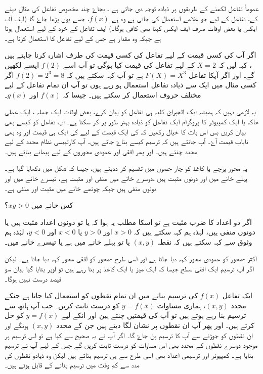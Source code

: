 عموماً تفاعل لکھنے کے طریقوں پر ذیادہ توجہ دی جاتی ہے ، بجاۓ چند مخصوص تفاعل کی مثال دینے کے، تفاعل کے لیے جو علامے استعمال کی جاتی ہے وہ ہے \(f(x) \)، جسے یوں پڑھا جاۓ گا (ایف آف ایکس یا بعض اوقات صرف ایف ایکس کہنا بھی کافی ہوگا۔) ایف  تفاعل کے خود کے لیے استعمال ہوتا ہے جبکہ  وہ مقدار ہے جس کے لیے تفاعل کا استعمال کرنا ہے۔
 
اگر آپ  کی کسی قیمت کے لیے تفاعل کی کسی قیمت کی طرف اشارہ کرنا چاہتے ہیں ، کہہ لیں کہ \( X=2          \) کے لیے تفاعل کی قیمت کیا ہوگی تو آپ اسے \(f(2) \) ایسے لکھیں گے۔ اور اگر آپکا تفاعل \( F(X) =X^{3}         \) ہے تو آپ کہہ سکتے ہیں کہ \(f(2)=2^{3}=8\)
اگر کسی مثال میں ایک سے ذیادہ تفاعل استعمال ہو رہے ہوں تو آپ ان تمام تفاعل کے لیے مختلف حروف استعمال کر سکتے ہیں۔ جیسا کہ \( f(x)         \) اور \(g(x)  \)۔

یہ لازمی نہیں کہ ہمیشہ ایک الجبرائ کلیہ ہی تفاعل کو بیان کرے، بعض اوقات ایک جملہ ،  ایک عملی خاکہ   یا ایک کمپیوٹر کا پروگرام  ایک تفاعل کو ذیادہ بہتر طور پر   کر سکتا ہے۔ آپ تفاعل کو کیسے بھی بیان کریں بس اس بات کا خیال رکھیں کہ  کی ایک قیمت کے لیے  کی ایک ہی قیمت اور وہ بھی نایاب قیمت آۓ۔
آپ جانتے ہیں کہ ترسیم کیسے بناۓ جاتے ہیں۔ آپ کارتییسی نظام محدد کے لیے محدد چنتے ہیں۔ اور پھر افقی اور عمودی محوروں کے لیے پیمانے بناتے ہیں۔

یہ محور پرچے یا کاغذ کو چار حصوں میں تقسیم کر ددیتے ہیں، جیسا کہ شکل  میں دکھایا گیا ہے۔ پہلے خانے میں  اور  دونوں مثبت ہیں ،دوسرے خانے میں  منفی اور    مثبت  ہے،   تیسرے خانے میں  اور  دونوں منفی ہیں جبکہ چوتھے خانے میں  مثبت اور   منفی  ہے۔

کس خانے میں \(xy>0\)؟

اگر دو اعداد کا ضرب مثبت ہے تو اسکا مطلب یہ ہوا کہ یا تو دونوں اعداد مثبت ہیں یا دونوں منفی ہیں، لہٰذہ ہم کہہ سکتے ہیں کہ \(    x>0  \) اور \(   y>0 \) یا \( x<0 \) اور \( y<0 \)، لہٰذہ ہم وثوق سے کہہ سکتے ہیں کہ نقطہ \( (x,y)\) یا تو پہلے خانے میں ہے یا تیسرے خانے میں۔

اکثر -محور کو عمودی محور کہہ دیا جاتا ہے اور اسی طرح -محور کو افقی محور کہہ دیا جاتا ہے۔ لیکن اگر آپ ترسیم ایک افقی سطح جیسا کہ ایک میز یا ایک کاغذ پر بنا رہے ہیں تو اوپر بتایا  گیا بیان سو فیصد درست نہیں ہوگا۔

ایک تفاعل \(f(x)  \) کی ترسیم بنانے میں ان تمام نقطوں کو استعمال کیا جاتا ہے جنکے محدد \( (x,y)\)، ہماری مساوات \(y=f(x)  \) کو درست ثابت کریں۔ جب آپ ہاتھ سے ترسیم بنا رہے ہوتے ہیں تو آپ    کی قیمتیں چنتے ہین اور انکے لیے \(y=f(x)  \) کو حل کرتے ہیں۔ اور پھر آپ ان نقطوں پر نشان لگا دیتے ہیں جن کے محدد \( (x,y)\) ہونگے اور ان نقطوں کو جوڑنے سے آپ کا ترسیم بن جاۓ گا۔ اگر آپ نے یہ صحیح سے کیا ہے تو اس ترسیم پر موجود دوسرے نقطوں کے محدد بھی اس مساوات کو درست ثابت کریں گے جس کے لیے آپ نے ترسیم بنایا ہے۔ کمپیوٹر اور ترسیمی اعداد بھی اسی طرح سے ہی ترسیم بناتے ہیں لیکن وہ  ذیادو نقطوں کی مدد سے کم وقت میں ترسیم بنانے کے قابل ہوتے ہیں۔

